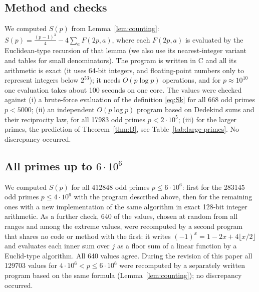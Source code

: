 \subsection{Method and checks}\label{subsec:method-checks}
We computed $S(p)$ from Lemma~\ref{lem:counting}: $S(p)=\frac{(p-1)^3}{4}-4\sum_aF(2p,a)$, where each $F(2p,a)$ is evaluated by the Euclidean-type recursion of that lemma (we also use its nearest-integer variant and tables for small denominators). The program is written in C and all its arithmetic is exact (it uses 64-bit integers, and floating-point numbers only to represent integers below $2^{53}$); it needs $O(p\log p)$ operations, and for $p\approx 10^{10}$ one evaluation takes about 100 seconds on one core. The values were checked against (i) a brute-force evaluation of the definition \eqref{eq:Sk} for all 668 odd primes $p<5000$; (ii) an independent $O(p\log p)$ program based on Dedekind sums and their reciprocity law, for all 17983 odd primes $p<2\cdot 10^5$; (iii) for the larger primes, the prediction of Theorem~\ref{thm:B}, see Table~\ref{tab:large-primes}. No discrepancy occurred.

\subsection{\texorpdfstring{All primes up to $6\cdot 10^6$}{All primes up to 6*10\textasciicircum 6}}\label{subsec:all-primes}
We computed $S(p)$ for all 412848 odd primes $p\le 6\cdot 10^6$: first for the 283145 odd primes $p\le4\cdot10^6$ with the program described above, then for the remaining ones with a new implementation of the same algorithm in exact 128-bit integer arithmetic. As a further check, 640 of the values, chosen at random from all ranges and among the extreme values, were recomputed by a second program that shares no code or method with the first: it writes $(-1)^x=1-2x+4\lfloor x/2\rfloor$ and evaluates each inner sum over $j$ as a floor sum of a linear function by a Euclid-type algorithm. All 640 values agree. During the revision of this paper all 129703 values for $4\cdot10^6<p\le6\cdot10^6$ were recomputed by a separately written program based on the same formula (Lemma~\ref{lem:counting}); no discrepancy occurred.


